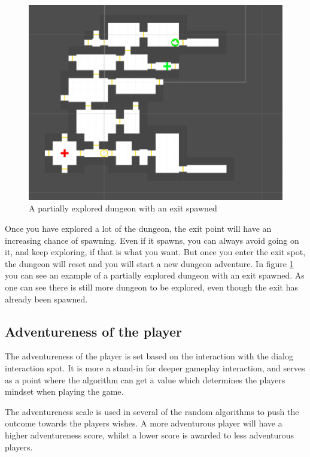 \documentclass[conference,compsoc]{IEEEtran}
\begin{document}
\begin{figure}[h]
	\graphicspath{{figures/}}
	\includegraphics[width = \columnwidth ]{DungeonLayout.png}
	\caption{A partially explored dungeon with an exit spawned}
	\label{fig:dungparexit}
\end{figure}
Once you have explored a lot of the dungeon, the exit point will have an increasing chance of spawning. Even if it spawns, you can always avoid going on it, and keep exploring, if that is what you want. But once you enter the exit spot, the dungeon will reset and you will start a new dungeon adventure.
In figure \ref{fig:dungparexit} you can see an example of a partially explored dungeon with an exit spawned. As one can see there is still more dungeon to be explored, even though the exit has already been spawned.

\subsection{Adventureness of the player}
\label{sec:adven}
The adventureness of the player is set based on the interaction with the dialog interaction spot. It is more a stand-in for deeper gameplay interaction, and serves as a point where the algorithm can get a value which determines the players mindset when playing the game. 

The adventureness scale is used in several of the random algorithms to push the outcome towards the players wishes. A more adventurous player will have a higher adventureness score, whilst a lower score is awarded to less adventurous players.
\end{document}
